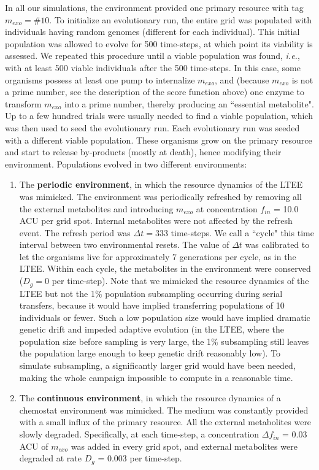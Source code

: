 In all our simulations, the environment provided one primary resource with tag $m_{exo} = \#10$. 
To initialize an evolutionary run, the entire grid was populated with individuals having random genomes (different for each individual). This initial population was allowed to evolve for 500 time-steps, at which point its viability is assessed. We repeated this procedure until a viable population was found, \textit{i.e.}, with at least 500 viable individuals after the 500 time-steps. In this case, some organisms possess at least one pump to internalize $m_{exo}$, and (because $m_{exo}$ is not a prime number, see the description of the score function above) one enzyme to transform $m_{exo}$ into a prime number, thereby producing an ``essential metabolite". Up to a few hundred trials were usually needed to find a viable population, which was then used to seed the evolutionary run. Each evolutionary run was seeded with a different viable population.
These organisms grow on the primary resource and start to release by-products (mostly at death), hence modifying their environment. Populations evolved in two different environments:

\begin{enumerate}
\item The \textbf{periodic environment}, in which the resource dynamics of the LTEE \citep{elena-and-lenski-2003} was mimicked. The environment was periodically refreshed by removing all the external metabolites and introducing $m_{exo}$ at concentration $f_{in}$ = 10.0 ACU per grid spot. Internal metabolites were not affected by the refresh event.
The refresh period was $\Delta t = 333$ time-steps. We call a ``cycle" this time interval between two environmental resets.
The value of $\Delta t$ was calibrated to let the organisms live for approximately 7 generations per cycle, as in the LTEE.
Within each cycle, the metabolites in the environment were conserved ($D_g = 0$ per time-step).
Note that we mimicked the resource dynamics of the LTEE but not the 1\% population subsampling occurring during serial transfers, because it would have implied transferring populations of 10 individuals or fewer. Such a low population size would have implied dramatic genetic drift and impeded adaptive evolution (in the LTEE, where the population size before sampling is very large, the 1\% subsampling still leaves the population large enough to keep genetic drift reasonably low). To simulate subsampling, a significantly larger grid would have been needed, making the whole campaign impossible to compute in a reasonable time.
\item The \textbf{continuous environment}, in which the resource dynamics of a chemostat environment was mimicked. The medium was constantly provided with a small influx of the primary resource. All the external metabolites were slowly degraded. Specifically, at each time-step, a concentration $\Delta f_{in}$ = 0.03 ACU of $m_{exo}$ was added in every grid spot, and external metabolites were degraded at rate $D_g$ = 0.003 per time-step.
\end{enumerate}

